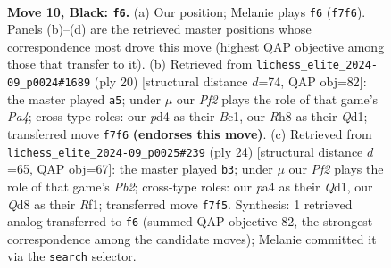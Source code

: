 \documentclass[11pt]{article}
\begin{document}
\clearpage

\begin{figure}[p]\centering
\begin{subfigure}{0.46\textwidth}\centering
\resizebox{\linewidth}{!}{%
\newchessgame
\chessboard[
  setfen={rnbqkb1r/ppp1pp2/1n4p1/3pP1Np/P2P4/NB6/1PP2PPP/R1BQ1RK1 b kq - 1 10},
  showmover=false,
  pgfstyle=straightmove, color=movearrow, markmove={f7-f6}
]}
\caption{}
\end{subfigure}\hfill
\begin{subfigure}{0.46\textwidth}\centering
\resizebox{\linewidth}{!}{%
\newchessgame
\chessboard[
  setfen={r1bq1rk1/1p2bppp/p2p1n2/2p1p3/P1N1P3/3P1N1P/1PP2PP1/R1BQR1K1 w - - 0 11},
  showmover=false,
  pgfstyle=straightmove, color=movearrow, markmove={a4-a5}
]}
\caption{}
\end{subfigure}
\\[4pt]
\begin{subfigure}{0.46\textwidth}\centering
\resizebox{\linewidth}{!}{%
\newchessgame
\chessboard[
  setfen={r1bq1rk1/pp2bppp/4pn2/3p4/2nP4/P1N2NP1/1P2PPBP/R1BQ1RK1 w - - 5 13},
  showmover=false,
  pgfstyle=straightmove, color=movearrow, markmove={b2-b3}
]}
\caption{}
\end{subfigure}\hfill

\caption{\textbf{Move 10, Black: \texttt{f6}.} (a) Our position; Melanie plays \texttt{f6} (\texttt{f7f6}). Panels (b)--(d) are the retrieved master positions whose correspondence most drove this move (highest QAP objective among those that transfer to it). (b) Retrieved from \texttt{lichess\_elite\_2024-09\_p0024\#1689} (ply 20) [structural distance $d$=74, QAP obj=82]: the master played \texttt{a5}; under $\mu$ our \emph{Pf2} plays the role of that game's \emph{Pa4}; cross-type roles: our \emph{p}d4 as their \emph{B}c1, our \emph{R}h8 as their \emph{Q}d1; transferred move \texttt{f7f6} \textbf{(endorses this move)}. (c) Retrieved from \texttt{lichess\_elite\_2024-09\_p0025\#239} (ply 24) [structural distance $d$=65, QAP obj=67]: the master played \texttt{b3}; under $\mu$ our \emph{Pf2} plays the role of that game's \emph{Pb2}; cross-type roles: our \emph{p}a4 as their \emph{Q}d1, our \emph{Q}d8 as their \emph{R}f1; transferred move \texttt{f7f5}. Synthesis: 1 retrieved analog transferred to \texttt{f6} (summed QAP objective 82, the strongest correspondence among the candidate moves); Melanie committed it via the \texttt{search} selector.}
\label{fig:thought-m19}
\end{figure}
\end{document}
